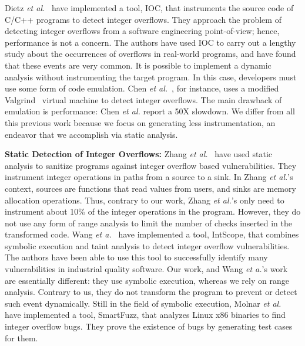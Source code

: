 \documentclass[preprint]{sigplanconf}[10pt]
\begin{document}
Dietz {\em et al.}~\cite{Dietz12} have 
implemented a tool, IOC, that instruments the source code of C/C++ programs to
detect integer overflows.
They approach the problem of detecting integer overflows from a software
engineering point-of-view; hence, performance is not a concern.
The authors have used IOC to carry out a lengthy study about the occurrences
of overflows in real-world programs, and have found that these events are very
common.
It is possible to implement a dynamic analysis without instrumenting the
target program.
In this case, developers must use some form of code emulation.
Chen {\em et al.}~\cite{Chen09}, for instance, uses a modified
Valgrind~\cite{Nethercote07} virtual machine to detect integer overflows.
The main drawback of emulation is performance: Chen {\em et al.} report a
50X slowdown.
We differ from all this previous work because we focus on generating less
instrumentation, an endeavor that we accomplish via static analysis.

\noindent
\textbf{Static Detection of Integer Overflows: }
Zhang {\em et al.}~\cite{Zhang09} have used static analysis to sanitize
programs against integer overflow based vulnerabilities.
They instrument integer operations in paths from a source to a sink.
In Zhang {\em et al.}'s context, sources are functions that read values from
users, and sinks are memory allocation operations.
Thus, contrary to our work, Zhang {\em et al.}'s only need to instrument
about 10\% of the integer operations in the program.
However, they do not use any form of range analysis to limit the number of
checks inserted in the transformed code.
Wang {\em et a.}~\cite{Wang09} have implemented a tool, IntScope, that combines symbolic execution and taint analysis to detect integer overflow vulnerabilities. The authors have been able to use this tool to successfully identify many vulnerabilities in industrial quality software. Our work, and Wang {\em et a.}'s work are essentially different: they use symbolic execution, whereas we rely on
range analysis.
Contrary to us, they do not transform the program to prevent or detect such event dynamically.
Still in the field of symbolic execution, Molnar
{\em et al.}~\cite{Molnar09} have implemented a tool, SmartFuzz, that analyzes
Linux x86 binaries to find integer overflow bugs.
They prove the existence of bugs by generating test cases for them.
\end{document}

